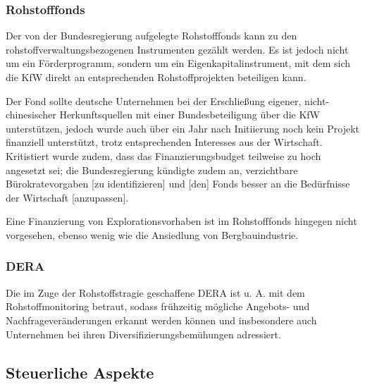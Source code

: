 \documentclass[12pt,a4paper,oneside]{book} %
\begin{document}
\subsubsection{Rohstofffonds}
Der von der Bundesregierung aufgelegte Rohstofffonds kann zu den rohstoffverwaltungsbezogenen Instrumenten gezählt werden. Es ist jedoch nicht um ein Förderprogramm, sondern um ein Eigenkapitalinstrument, mit dem sich die KfW direkt an entsprechenden Rohstoffprojekten beteiligen kann.\autocite{Frenz 2025, S. 761}

Der Fond sollte deutsche Unternehmen bei der Erschließung eigener, nicht-chinesischer Herkunftsquellen mit einer Bundesbeteiligung über die KfW unterstützen, jedoch wurde auch über ein Jahr nach Initiierung noch kein Projekt finanziell unterstützt, trotz entsprechenden Interesses aus der Wirtschaft. Kritistiert wurde zudem, dass das Finanzierungsbudget teilweise zu hoch angesetzt sei; die Bundesregierung kündigte zudem an, \glqq verzichtbare Bürokratevorgaben [zu identifizieren] und [den] Fonds besser an die Bedürfnisse der Wirtschaft [anzupassen]\grqq.\autocite{Wirtschaft fordert mehr Tempo bei Rohstofffonds}

Eine Finanzierung von Explorationsvorhaben ist im Rohstofffonds hingegen nicht vorgesehen, ebenso wenig wie die Ansiedlung von Bergbauindustrie.



\subsubsection{DERA}

Die im Zuge der Rohstoffstragie geschaffene DERA ist u. A. mit dem Rohstoffmonitoring betraut, sodass frühzeitig mögliche Angebots- und Nachfrageveränderungen erkannt werden können und insbesondere auch Unternehmen bei ihren Diversifizierungsbemühungen adressiert.\autocite[siehe auch]{Frenz 2025, S: 763ff.}

\subsection{Steuerliche Aspekte}
\end{document}
